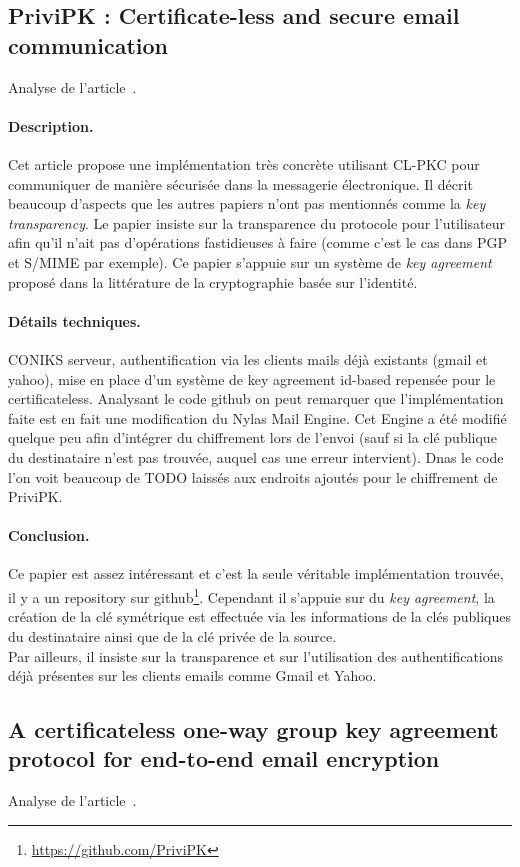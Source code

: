 \subsection{PriviPK : Certificate-less and secure email communication}
Analyse de l'article~\cite{DBLP:journals/compsec/AlSabahTLSD17}.
\paragraph*{Description.} Cet article propose une implémentation très concrète utilisant CL-PKC pour communiquer de manière sécurisée dans la messagerie électronique. Il décrit beaucoup d'aspects que les autres papiers n'ont pas mentionnés comme la \textit{key transparency}. Le papier insiste sur la transparence du protocole pour l'utilisateur afin qu'il n'ait pas d'opérations fastidieuses à faire (comme c'est le cas dans PGP et S/MIME par exemple). Ce papier s'appuie sur un système de \textit{key agreement} proposé dans la littérature de la cryptographie basée sur l'identité.
\paragraph*{Détails techniques.} CONIKS serveur, authentification via les clients mails déjà existants (gmail et yahoo), mise en place d'un système de key agreement id-based repensée pour le certificateless. Analysant le code github on peut remarquer que l'implémentation faite est en fait une modification du Nylas Mail Engine. Cet Engine a été modifié quelque peu afin d'intégrer du chiffrement lors de l'envoi (sauf si la clé publique du destinataire n'est pas trouvée, auquel cas une erreur intervient). Dnas le code l'on voit beaucoup de TODO laissés aux endroits ajoutés pour le chiffrement de PriviPK. 
\paragraph*{Conclusion.} Ce papier est assez intéressant et c'est la seule véritable implémentation trouvée, il y a un repository sur github\footnote{\url{https://github.com/PriviPK}}. Cependant il s'appuie sur du \textit{key agreement}, la création de la clé symétrique est effectuée via les informations de la clés publiques du destinataire ainsi que de la clé privée de la source.\\
Par ailleurs, il insiste sur la transparence et sur l'utilisation des authentifications déjà présentes sur les clients emails comme Gmail et Yahoo.
\subsection{A certificateless one-way group key agreement protocol for end-to-end email encryption}
Analyse de l'article~\cite{DBLP:conf/prdc/YehSDSSW18}.
